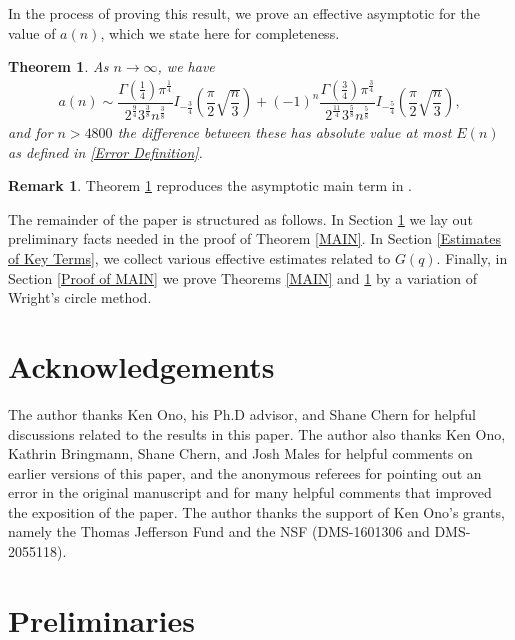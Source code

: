 \documentclass[11pt,reqno]{amsart}
\newtheorem{theorem}{Theorem}[section]
\theoremstyle{definition}
\newtheorem*{remark}{Remark}
\theoremstyle{plain}
\theoremstyle{named}
\numberwithin{equation}{section}
\theoremstyle{example}
\def\lp{\left(}
\def\rp{\right)}
\begin{document}
In the process of proving this result, we prove an effective asymptotic for the value of $a(n)$, which we state here for completeness.

\begin{theorem} \label{a(n) Asymptotics}
As $n \to \infty$, we have
\begin{align*}
	a(n) \sim \dfrac{\Gamma\lp \frac 14 \rp \pi^{\frac 14}}{2^{\frac 94} 3^{\frac 38} n^{\frac 38}} I_{-\frac 34} \lp \dfrac{\pi}{2} \sqrt{\dfrac{n}{3}} \rp + (-1)^n \dfrac{\Gamma\lp \frac 34 \rp \pi^{\frac 34}}{2^{\frac{11}{4}} 3^{\frac 58} n^{\frac 58}} I_{-\frac 54}\lp \dfrac{\pi}{2} \sqrt{\dfrac{n}{3}} \rp,
\end{align*}
and for $n > 4800$ the difference between these has absolute value at most $E(n)$ as defined in \eqref{Error Definition}.
\end{theorem}

\begin{remark}
Theorem \ref{a(n) Asymptotics} reproduces the asymptotic main term in \cite[Theorem 1.2]{Chern}.
\end{remark}

The remainder of the paper is structured as follows. In Section \ref{Preliminaries} we lay out preliminary facts needed in the proof of Theorem \ref{MAIN}. In Section \ref{Estimates of Key Terms}, we collect various effective estimates related to $G(q)$. Finally, in Section \ref{Proof of MAIN} we prove Theorems \ref{MAIN} and \ref{a(n) Asymptotics} by a variation of Wright's circle method.

\section*{Acknowledgements}
The author thanks Ken Ono, his Ph.D advisor, and Shane Chern for helpful discussions related to the results in this paper. The author also thanks Ken Ono, Kathrin Bringmann, Shane Chern, and Josh Males for helpful comments on earlier versions of this paper, and the anonymous referees for pointing out an error in the original manuscript and for many helpful comments that improved the exposition of the paper. The author thanks the support of Ken Ono's grants, namely the Thomas Jefferson Fund and the NSF (DMS-1601306 and DMS-2055118).

\section{Preliminaries} \label{Preliminaries}
\end{document}
